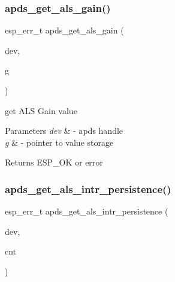 \subsubsection{\texorpdfstring{apds\+\_\+get\+\_\+als\+\_\+gain()}{apds\_get\_als\_gain()}}
{\footnotesize\ttfamily esp\+\_\+err\+\_\+t apds\+\_\+get\+\_\+als\+\_\+gain (\begin{DoxyParamCaption}\item[{\hyperlink{structAPDS9960__Driver}{A\+P\+D\+S\+\_\+\+D\+EV}}]{dev,  }\item[{als\+\_\+gain\+\_\+t $\ast$}]{g }\end{DoxyParamCaption})}




\begin{DoxyItemize}
\item get A\+LS Gain value 
\end{DoxyItemize}


\begin{DoxyParams}{Parameters}
{\em dev} & -\/ apds handle \\
\hline
{\em g} & -\/ pointer to value storage \\
\hline
\end{DoxyParams}
\begin{DoxyReturn}{Returns}
E\+S\+P\+\_\+\+OK or error 
\end{DoxyReturn}
\mbox{\label{group__APDS9960__ALSFunctions_ga4831a3f5cec693f908b0f5a44d41c4da}} 
\subsubsection{\texorpdfstring{apds\+\_\+get\+\_\+als\+\_\+intr\+\_\+persistence()}{apds\_get\_als\_intr\_persistence()}}
{\footnotesize\ttfamily esp\+\_\+err\+\_\+t apds\+\_\+get\+\_\+als\+\_\+intr\+\_\+persistence (\begin{DoxyParamCaption}\item[{\hyperlink{structAPDS9960__Driver}{A\+P\+D\+S\+\_\+\+D\+EV}}]{dev,  }\item[{\hyperlink{vl53l0x__types_8h_aba7bc1797add20fe3efdf37ced1182c5}{uint8\+\_\+t} $\ast$}]{cnt }\end{DoxyParamCaption})}




